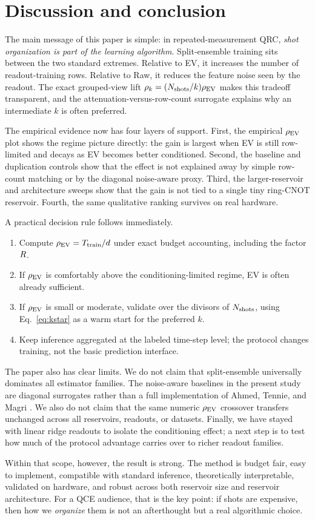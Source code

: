 \section{Discussion and conclusion}
\label{sec:conclusion}

The main message of this paper is simple: in repeated-measurement QRC, \emph{shot organization is part of the learning algorithm}. Split-ensemble training sits between the two standard extremes. Relative to EV, it increases the number of readout-training rows. Relative to Raw, it reduces the feature noise seen by the readout. The exact grouped-view lift $\rho_k=(N_{\mathrm{shots}}/k)\rho_{\mathrm{EV}}$ makes this tradeoff transparent, and the attenuation-versus-row-count surrogate explains why an intermediate $k$ is often preferred.

The empirical evidence now has four layers of support. First, the empirical $\rho_{\mathrm{EV}}$ plot shows the regime picture directly: the gain is largest when EV is still row-limited and decays as EV becomes better conditioned. Second, the baseline and duplication controls show that the effect is not explained away by simple row-count matching or by the diagonal noise-aware proxy. Third, the larger-reservoir and architecture sweeps show that the gain is not tied to a single tiny ring-CNOT reservoir. Fourth, the same qualitative ranking survives on real hardware.

A practical decision rule follows immediately.
\begin{enumerate}[leftmargin=*]
    \item Compute $\rho_{\mathrm{EV}}=T_{\mathrm{train}}/d$ under exact budget accounting, including the factor $R$.
    \item If $\rho_{\mathrm{EV}}$ is comfortably above the conditioning-limited regime, EV is often already sufficient.
    \item If $\rho_{\mathrm{EV}}$ is small or moderate, validate over the divisors of $N_{\mathrm{shots}}$, using Eq.~\eqref{eq:kstar} as a warm start for the preferred $k$.
    \item Keep inference aggregated at the labeled time-step level; the protocol changes training, not the basic prediction interface.
\end{enumerate}

The paper also has clear limits. We do not claim that split-ensemble universally dominates all estimator families. The noise-aware baselines in the present study are diagonal surrogates rather than a full implementation of Ahmed, Tennie, and Magri \cite{ahmed2025optimal}. We also do not claim that the same numeric $\rho_{\mathrm{EV}}$ crossover transfers unchanged across all reservoirs, readouts, or datasets. Finally, we have stayed with linear ridge readouts to isolate the conditioning effect; a next step is to test how much of the protocol advantage carries over to richer readout families.

Within that scope, however, the result is strong. The method is budget fair, easy to implement, compatible with standard inference, theoretically interpretable, validated on hardware, and robust across both reservoir size and reservoir architecture. For a QCE audience, that is the key point: if shots are expensive, then how we \emph{organize} them is not an afterthought but a real algorithmic choice.
